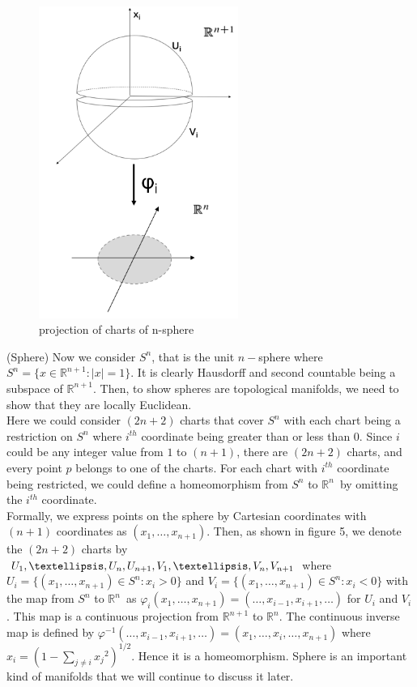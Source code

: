 \documentclass[12pt,twoside]{article}
\newcommand{\rn}{$\mathbb{R}^n$}
\begin{document}
\begin{figure}
\centering
\includegraphics[width=65mm]{projection of charts of n-sphere.png} 
\caption{projection of charts of n-sphere}
\end{figure}

\begin{example}{(Sphere)}
\label{sn mfd}
Now we consider $S^n$, that is the unit $n-$sphere where $S^{n}=\{x\in \mathbb{R}^{n+1}: |x| = 1\}$. It is clearly Hausdorff and second countable being a subspace of $\mathbb{R}^{n+1}$. Then, to show spheres are topological manifolds, we need to show that they are locally Euclidean.\\
Here we could consider $(2n+2)$ charts that cover $S^{n}$ with each chart being a restriction on $S^{n}$ where $i^{th}$ coordinate being greater than or less than 0. Since $i$ could be any integer value from $1$ to $(n+1)$, there are $(2n+2)$ charts, and every point $p$ belongs to one of the charts. For each chart with $i^{th}$ coordinate being restricted, we could define a homeomorphism from $S^{n}$ to \rn\ by omitting the $i^{th}$ coordinate.\\
Formally, we express points on the sphere by Cartesian coordinates with $(n+1)$ coordinates as $(x_1,…,x_{n+1})$. Then, as shown in figure 5, we denote the $(2n+2)$ charts by $U_1,…,U_n,U_{n+1},V_1,…
\\
,V_n,V_{n+1}$ where $U_i=\{(x_1,…,x_{n+1})\in S^n:x_i>0\}$ and $V_i=\{(x_1,…,x_{n+1})\in S^n:x_i<0\}$ with the map from $S^n$ to \rn\ as  $\varphi_i(x_1,…,x_{n+1})=(…,x_{i-1},x_{i+1},…)$ for $U_i$ and $V_i$. This map is a continuous projection from $\mathbb{R}^{n+1}$ to \rn. The continuous inverse map is defined by $\varphi^{-1}(…,x_{i-1},x_{i+1},…)=(x_1,…,x_i,…,x_{n+1})$ where $x_i=(1-\sum_{j\neq i}{x_j}^2)^{1/2}$. Hence it is a homeomorphism. Sphere is an important kind of manifolds that we will continue to discuss it later.
\end{example}
\end{document}
